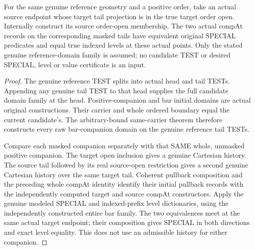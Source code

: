 \begin{theorem}
\label{hir:original-modeled-run-companion-special-level}
\leanok
For the same genuine reference geometry and a positive order, take an actual
source endpoint whose target tail projection is in the true target order
open. Internally construct its source order-open membership. The two actual
compAt records on the corresponding masked tails have equivalent original
SPECIAL predicates and equal true indexed levels at these actual points.
Only the stated genuine reference-domain family is assumed; no candidate
TEST or desired SPECIAL, level or value certificate is an input.
\end{theorem}
\begin{proof}
The genuine reference TEST splits into actual head and tail TESTs. Appending
any genuine tail TEST to that head supplies the full candidate domain family
at the head. Positive-companion and bar initial domains are actual original
constructions. Their carrier and whole ordered boundary equal the current
candidate's. The arbitrary-bound same-carrier theorem therefore constructs
every raw bar-companion domain on the genuine reference tail TESTs.

Compare each masked companion separately with that SAME whole, unmasked
positive companion. The target open inclusion gives a genuine Cartesian
history. The source tail followed by its real source-open restriction gives
a second genuine Cartesian history over the same target tail. Coherent
pullback composition and the preceding whole compAt identity identify their
initial pullback records with the independently computed target and source
compAt constructors. Apply the genuine modeled SPECIAL and indexed-prefix
level dictionaries, using the independently constructed entire bar family.
The two equivalences meet at the same actual target endpoint; their
composition gives SPECIAL in both directions and exact level equality.
This does not use an admissible history for either companion.
\end{proof}

